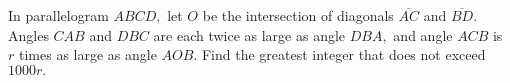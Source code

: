 In parallelogram $ABCD,$ let $O$ be the intersection of diagonals $\overline{AC}$ and $\overline{BD}.$  Angles $CAB$ and $DBC$ are each twice as large as angle $DBA,$ and angle $ACB$ is $r$ times as large as angle $AOB.$  Find the greatest integer that does not exceed $1000r.$